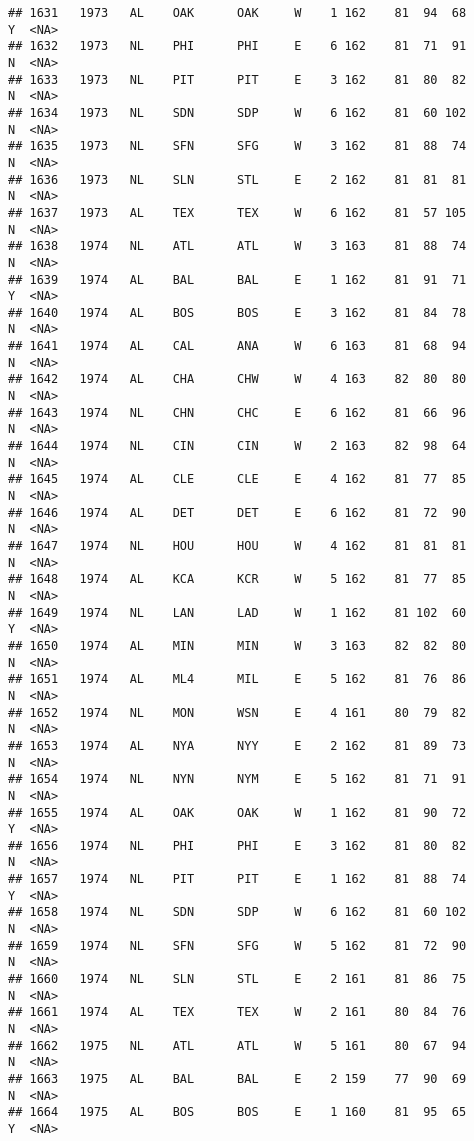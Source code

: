 \documentclass[]{article}
\begin{document}
\begin{verbatim}
## 1631   1973   AL    OAK      OAK     W    1 162    81  94  68      Y  <NA>
## 1632   1973   NL    PHI      PHI     E    6 162    81  71  91      N  <NA>
## 1633   1973   NL    PIT      PIT     E    3 162    81  80  82      N  <NA>
## 1634   1973   NL    SDN      SDP     W    6 162    81  60 102      N  <NA>
## 1635   1973   NL    SFN      SFG     W    3 162    81  88  74      N  <NA>
## 1636   1973   NL    SLN      STL     E    2 162    81  81  81      N  <NA>
## 1637   1973   AL    TEX      TEX     W    6 162    81  57 105      N  <NA>
## 1638   1974   NL    ATL      ATL     W    3 163    81  88  74      N  <NA>
## 1639   1974   AL    BAL      BAL     E    1 162    81  91  71      Y  <NA>
## 1640   1974   AL    BOS      BOS     E    3 162    81  84  78      N  <NA>
## 1641   1974   AL    CAL      ANA     W    6 163    81  68  94      N  <NA>
## 1642   1974   AL    CHA      CHW     W    4 163    82  80  80      N  <NA>
## 1643   1974   NL    CHN      CHC     E    6 162    81  66  96      N  <NA>
## 1644   1974   NL    CIN      CIN     W    2 163    82  98  64      N  <NA>
## 1645   1974   AL    CLE      CLE     E    4 162    81  77  85      N  <NA>
## 1646   1974   AL    DET      DET     E    6 162    81  72  90      N  <NA>
## 1647   1974   NL    HOU      HOU     W    4 162    81  81  81      N  <NA>
## 1648   1974   AL    KCA      KCR     W    5 162    81  77  85      N  <NA>
## 1649   1974   NL    LAN      LAD     W    1 162    81 102  60      Y  <NA>
## 1650   1974   AL    MIN      MIN     W    3 163    82  82  80      N  <NA>
## 1651   1974   AL    ML4      MIL     E    5 162    81  76  86      N  <NA>
## 1652   1974   NL    MON      WSN     E    4 161    80  79  82      N  <NA>
## 1653   1974   AL    NYA      NYY     E    2 162    81  89  73      N  <NA>
## 1654   1974   NL    NYN      NYM     E    5 162    81  71  91      N  <NA>
## 1655   1974   AL    OAK      OAK     W    1 162    81  90  72      Y  <NA>
## 1656   1974   NL    PHI      PHI     E    3 162    81  80  82      N  <NA>
## 1657   1974   NL    PIT      PIT     E    1 162    81  88  74      Y  <NA>
## 1658   1974   NL    SDN      SDP     W    6 162    81  60 102      N  <NA>
## 1659   1974   NL    SFN      SFG     W    5 162    81  72  90      N  <NA>
## 1660   1974   NL    SLN      STL     E    2 161    81  86  75      N  <NA>
## 1661   1974   AL    TEX      TEX     W    2 161    80  84  76      N  <NA>
## 1662   1975   NL    ATL      ATL     W    5 161    80  67  94      N  <NA>
## 1663   1975   AL    BAL      BAL     E    2 159    77  90  69      N  <NA>
## 1664   1975   AL    BOS      BOS     E    1 160    81  95  65      Y  <NA>

\end{verbatim}
\end{document}
